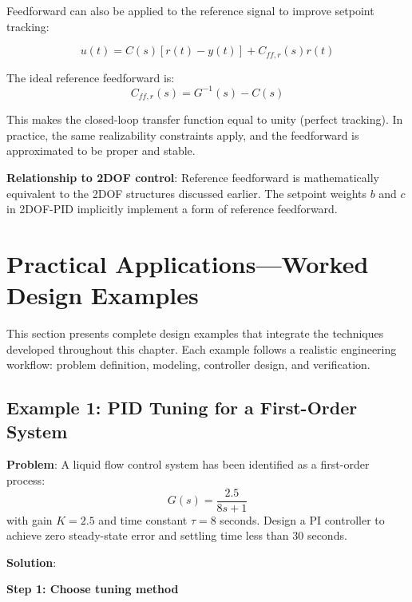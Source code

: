 Feedforward can also be applied to the reference signal to improve setpoint tracking:

\begin{equation}
u(t) = C(s)[r(t) - y(t)] + C_{ff,r}(s) r(t)
\end{equation}

The ideal reference feedforward is:
\begin{equation}
C_{ff,r}(s) = G^{-1}(s) - C(s)
\end{equation}

This makes the closed-loop transfer function equal to unity (perfect tracking). In practice, the same realizability constraints apply, and the feedforward is approximated to be proper and stable.

\textbf{Relationship to 2DOF control}: Reference feedforward is mathematically equivalent to the 2DOF structures discussed earlier. The setpoint weights $b$ and $c$ in 2DOF-PID implicitly implement a form of reference feedforward.

\section{Practical Applications---Worked Design Examples}
\label{sec:design_examples}

This section presents complete design examples that integrate the techniques developed throughout this chapter. Each example follows a realistic engineering workflow: problem definition, modeling, controller design, and verification.

\subsection{Example 1: PID Tuning for a First-Order System}
\label{subsec:ex_first_order}

\textbf{Problem}: A liquid flow control system has been identified as a first-order process:
\begin{equation}
G(s) = \frac{2.5}{8s + 1}
\end{equation}
with gain $K = 2.5$ and time constant $\tau = 8$ seconds. Design a PI controller to achieve zero steady-state error and settling time less than 30 seconds.

\textbf{Solution}:

\textbf{Step 1: Choose tuning method}

